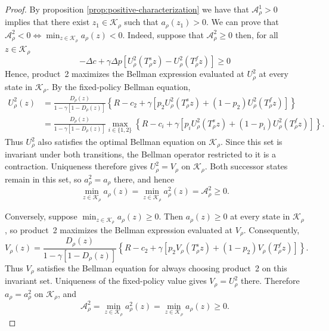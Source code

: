 \documentclass[11pt]{article}
\begin{document}
\begin{proof}
By proposition \ref{prop:positive-characterization} we have that $\mathcal A_\rho^1>0$ implies that there exist $z_1 \in \mathcal K_\rho$ such that $a_\rho(z_1)>0$. 
We can prove that $\mathcal A_\rho^2<0 \iff \min_{z\in\mathcal K_\rho} a_\rho(z) <0 $. Indeed, suppose that $\mathcal A_\rho^2\ge0$ then, for all $z \in \mathcal K_\rho$
\begin{equation}
    -\Delta c + \gamma \Delta p\left[U_\rho^2(T_\rho^s z)-U_\rho^2(T_\rho^f z)\right] \ge 0 
\end{equation}
Hence, product~2 maximizes the Bellman expression evaluated at
$U_\rho^2$ at every state in $\mathcal K_\rho$. By the fixed-policy
Bellman equation,
\begin{align*}
U_\rho^2(z)
&=\frac{D_\rho(z)}{1-\gamma[1-D_\rho(z)]}
\left\{R-c_2+\gamma\left[p_2U_\rho^2(T_\rho^s z)
+(1-p_2)U_\rho^2(T_\rho^f z)\right]\right\}\\
&=\frac{D_\rho(z)}{1-\gamma[1-D_\rho(z)]}
\max_{i\in\{1,2\}}
\left\{R-c_i+\gamma\left[p_iU_\rho^2(T_\rho^s z)
+(1-p_i)U_\rho^2(T_\rho^f z)\right]\right\}.
\end{align*}
Thus $U_\rho^2$ also satisfies the optimal Bellman equation on
$\mathcal K_\rho$. Since this set is invariant under both transitions,
the Bellman operator restricted to it is a contraction. Uniqueness
therefore gives $U_\rho^2=V_\rho$ on $\mathcal K_\rho$.
Both successor states remain in this set, so $a_\rho^2=a_\rho$ there,
and hence
\begin{equation*}
\min_{z\in\mathcal K_\rho}a_\rho(z)
=\min_{z\in\mathcal K_\rho}a_\rho^2(z)
=\mathcal A_\rho^2\geq0.
\end{equation*}

Conversely, suppose $\min_{z\in\mathcal K_\rho}a_\rho(z)\geq0$.
Then $a_\rho(z)\geq0$ at every state in $\mathcal K_\rho$, so
product~2 maximizes the Bellman expression evaluated at $V_\rho$.
Consequently,
\begin{equation*}
V_\rho(z)
=\frac{D_\rho(z)}{1-\gamma[1-D_\rho(z)]}
\left\{R-c_2+\gamma\left[p_2V_\rho(T_\rho^s z)
+(1-p_2)V_\rho(T_\rho^f z)\right]\right\}.
\end{equation*}
Thus $V_\rho$ satisfies the Bellman equation for always choosing
product~2 on this invariant set. Uniqueness of the fixed-policy value
gives $V_\rho=U_\rho^2$ there. Therefore $a_\rho=a_\rho^2$ on
$\mathcal K_\rho$, and
\begin{equation*}
\mathcal A_\rho^2
=\min_{z\in\mathcal K_\rho}a_\rho^2(z)
=\min_{z\in\mathcal K_\rho}a_\rho(z)\geq0.
\end{equation*}


\end{proof}
\end{document}

